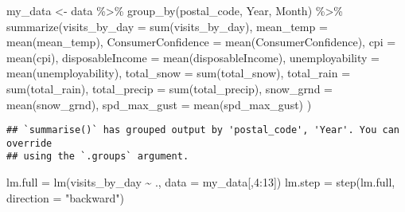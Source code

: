\documentclass[
]{article}
\newenvironment{Shaded}{\begin{snugshade}}{\end{snugshade}}
\newcommand{\AttributeTok}[1]{\textcolor[rgb]{0.77,0.63,0.00}{#1}}
\newcommand{\DecValTok}[1]{\textcolor[rgb]{0.00,0.00,0.81}{#1}}
\newcommand{\FunctionTok}[1]{\textcolor[rgb]{0.00,0.00,0.00}{#1}}
\newcommand{\NormalTok}[1]{#1}
\newcommand{\OtherTok}[1]{\textcolor[rgb]{0.56,0.35,0.01}{#1}}
\newcommand{\SpecialCharTok}[1]{\textcolor[rgb]{0.00,0.00,0.00}{#1}}
\newcommand{\StringTok}[1]{\textcolor[rgb]{0.31,0.60,0.02}{#1}}
\begin{document}
\begin{Shaded}
\begin{Highlighting}[]
\NormalTok{my\_data }\OtherTok{\textless{}{-}}\NormalTok{ data }\SpecialCharTok{\%\textgreater{}\%} \FunctionTok{group\_by}\NormalTok{(postal\_code, Year, Month) }\SpecialCharTok{\%\textgreater{}\%} \FunctionTok{summarize}\NormalTok{(}\AttributeTok{visits\_by\_day =} \FunctionTok{sum}\NormalTok{(visits\_by\_day),}
                                                                     \AttributeTok{mean\_temp =} \FunctionTok{mean}\NormalTok{(mean\_temp),}
                                                                     \AttributeTok{ConsumerConfidence =} \FunctionTok{mean}\NormalTok{(ConsumerConfidence),}
                                                                     \AttributeTok{cpi =} \FunctionTok{mean}\NormalTok{(cpi),}
                                                                     \AttributeTok{disposableIncome =} \FunctionTok{mean}\NormalTok{(disposableIncome),}
                                                                     \AttributeTok{unemployability =} \FunctionTok{mean}\NormalTok{(unemployability),}
                                                                     \AttributeTok{total\_snow =} \FunctionTok{sum}\NormalTok{(total\_snow),}
                                                                     \AttributeTok{total\_rain =} \FunctionTok{sum}\NormalTok{(total\_rain),}
                                                                     \AttributeTok{total\_precip =} \FunctionTok{sum}\NormalTok{(total\_precip),}
                                                                     \AttributeTok{snow\_grnd =} \FunctionTok{mean}\NormalTok{(snow\_grnd),}
                                                                     \AttributeTok{spd\_max\_gust =} \FunctionTok{mean}\NormalTok{(spd\_max\_gust)}
\NormalTok{                                                                     )}
\end{Highlighting}
\end{Shaded}

\begin{verbatim}
## `summarise()` has grouped output by 'postal_code', 'Year'. You can override
## using the `.groups` argument.
\end{verbatim}

\begin{Shaded}
\begin{Highlighting}[]
\NormalTok{lm.full }\OtherTok{=} \FunctionTok{lm}\NormalTok{(visits\_by\_day }\SpecialCharTok{\textasciitilde{}}\NormalTok{ ., }\AttributeTok{data =}\NormalTok{ my\_data[,}\DecValTok{4}\SpecialCharTok{:}\DecValTok{13}\NormalTok{])}
\NormalTok{lm.step }\OtherTok{=} \FunctionTok{step}\NormalTok{(lm.full, }\AttributeTok{direction =} \StringTok{"backward"}\NormalTok{)}
\end{Highlighting}
\end{Shaded}
\end{document}
